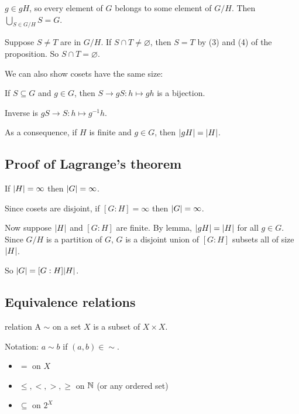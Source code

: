 \documentclass[12pt,letterpaper]{report}
\begin{document}
\begin{thmproof}
  $g \in gH$, so every element of $G$ belongs to some element of $G/H$.
  Then $\bigcup_{S \in G/H} S = G$.

  Suppose $S \neq T$ are in $G/H$.
  If $S \cap T \neq \varnothing$, then $S = T$ by (3) and (4) of the proposition.
  So $S \cap T = \varnothing$.
\end{thmproof}

We can also show cosets have the same size:

\begin{lem}{}{}
  If $S \subseteq G$ and $g \in G$, then $S \to gS : h \mapsto gh$ is a bijection.
\end{lem}

\begin{thmproof}
  Inverse is $gS \to S : h \mapsto g^{-1}h$.
\end{thmproof}

As a consequence, if $H$ is finite and $g \in G$, then $\lvert gH\rvert = \lvert H\rvert$.

\pagebreak
\subsection{Proof of Lagrange's theorem}

\begin{thmproof}
  If $\lvert H\rvert = \infty$ then $\lvert G\rvert = \infty$.

  Since cosets are disjoint, if $[G : H] = \infty$ then $\lvert G\rvert = \infty$.

  Now suppose $\lvert H\rvert$ and $[G : H]$ are finite.
  By lemma, $\lvert gH\rvert = \lvert H\rvert$ for all $g \in G$.
  Since $G/H$ is a partition of $G$, $G$ is a disjoint union of $[G : H]$ subsets all of size
  $\lvert H\rvert$.

  So $\lvert G\rvert = [G : H] \lvert H\rvert$.
\end{thmproof}

\pagebreak
\subsection{Equivalence relations}

\begin{defn}{relation}{}
  A  $\sim$ on a set $X$ is a subset of $X \times X$.

  Notation: $a \sim b$ if $(a, b) \in \mathop{\sim}$.
\end{defn}

\begin{ex}
  \begin{itemize}
    \item $=$ on $X$
    \item $\leq, <, >, \geq$ on $\mathbb{N}$ (or any ordered set)
    \item $\subseteq$ on $2^X$
  \end{itemize}
\end{ex}
\end{document}
